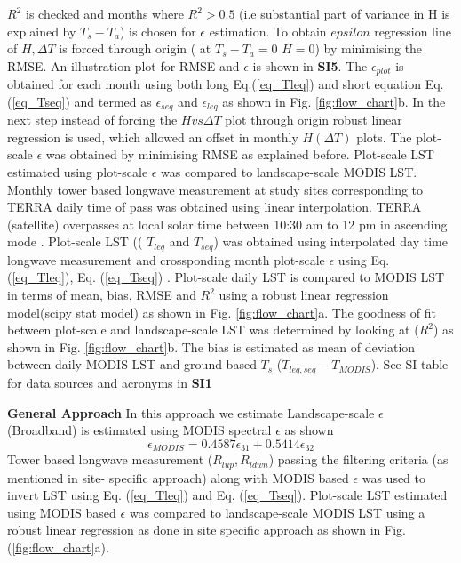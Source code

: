 \documentclass[fleqn,10pt]{wlscirep}
\begin{document}
{$R^2$ is checked and months where $R^{2} > 0.5$ (i.e substantial part of variance in H is explained by $T_{s} -T_{a}$) is chosen for $\epsilon$ estimation. To obtain $epsilon$ regression line of $H, \Delta T$ is forced through origin ( at $T_{s} - T_{a} = 0 $  $H=0$) by minimising  the RMSE. An illustration plot for RMSE and $\epsilon$ is shown in \textbf{SI5}. The  $\epsilon_{plot}$ is obtained for each month using both long Eq.(\ref{eq_Tleq}) and short equation Eq.(\ref{eq_Tseq}) and  termed as $\epsilon_{seq}$ and $\epsilon_{leq}$ as shown in Fig. \ref{fig:flow_chart}b. In the next step instead of forcing the $ H vs \Delta T$ plot through origin robust linear regression is used, which allowed an offset in monthly $H (\Delta T)$ plots. The plot-scale $\epsilon$ was obtained by minimising RMSE as explained before. Plot-scale LST estimated using plot-scale $\epsilon$ was compared to landscape-scale MODIS LST. Monthly tower based longwave measurement at study sites corresponding to TERRA daily time of pass was obtained using linear interpolation. TERRA (satellite) overpasses at local solar time between 10:30 am to 12 pm in ascending mode \cite{guillevic2017land}. Plot-scale LST (( $T_{leq}$ and $T_{seq}$) was obtained using interpolated day time longwave measurement and crossponding month plot-scale $\epsilon$ using Eq. (\ref{eq_Tleq}), Eq. (\ref{eq_Tseq}) . Plot-scale daily LST is compared to MODIS LST in terms of mean, bias, RMSE and $R^2$ using a robust linear regression model(scipy stat model) as shown in Fig. \ref{fig:flow_chart}a. The goodness of fit between plot-scale and landscape-scale LST was determined by looking at ($R^2$) as shown in Fig. \ref{fig:flow_chart}b. The bias is estimated as mean of deviation between daily MODIS LST and ground based $T_{s}$ ($T_{leq,seq} - T_{MODIS}$). See SI table for data sources and acronyms in \textbf{SI1}

\textbf{General Approach}
In this approach we estimate Landscape-scale $\epsilon$ (Broadband) is  estimated using MODIS spectral $\epsilon$ as shown\cite{bahir_evaluation_2017}
\begin{equation}\label{eq_emodis}
\epsilon_{MODIS}= 0.4587 \epsilon_{31} + 0.5414 \epsilon_{32}
\end{equation}
Tower based longwave measurement ($R_{lup}, R_{ldwn}$) passing the filtering criteria (as mentioned in site- specific approach) along with MODIS based $\epsilon$ was used  to invert LST using Eq. (\ref{eq_Tleq}) and  Eq. (\ref{eq_Tseq}). Plot-scale LST estimated using MODIS based $\epsilon$ was compared to landscape-scale MODIS LST using a robust linear regression as done in site specific approach as shown in Fig. (\ref{fig:flow_chart}a).

}
\end{document}

